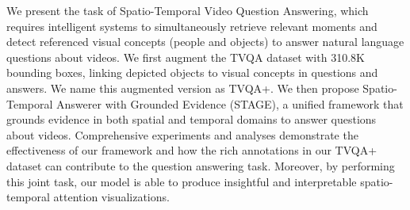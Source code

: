 We present the task of Spatio-Temporal Video Question Answering, which requires intelligent systems to simultaneously retrieve relevant moments and detect referenced visual concepts (people and objects) to answer natural language questions about videos. We first augment the TVQA dataset with 310.8K bounding boxes, linking depicted objects to visual concepts in questions and answers. We name this augmented version as TVQA+. We then propose Spatio-Temporal Answerer with Grounded Evidence (STAGE), a unified framework that grounds evidence in both spatial and temporal domains to answer questions about videos. Comprehensive experiments and analyses demonstrate the effectiveness of our framework and how the rich annotations in our TVQA+ dataset can contribute to the question answering task. Moreover, by performing this joint task, our model is able to produce insightful and interpretable spatio-temporal attention visualizations.
